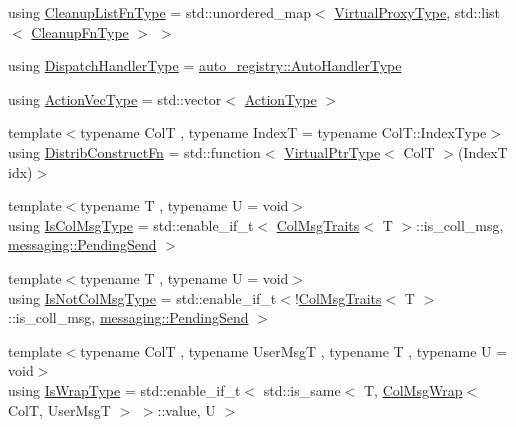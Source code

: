 \begin{DoxyCompactItemize}
using \hyperlink{structvt_1_1vrt_1_1collection_1_1_collection_manager_a735e54bc5a8646536d07750e2549a156}{Cleanup\+List\+Fn\+Type} = std\+::unordered\+\_\+map$<$ \hyperlink{namespacevt_a1b417dd5d684f045bb58a0ede70045ac}{Virtual\+Proxy\+Type}, std\+::list$<$ \hyperlink{structvt_1_1vrt_1_1collection_1_1_collection_manager_a95c122e5b83bc51c306c9367b8e62c07}{Cleanup\+Fn\+Type} $>$ $>$
\item 
using \hyperlink{structvt_1_1vrt_1_1collection_1_1_collection_manager_a0cfe02a0426e95ec9daa2ef7374e07c7}{Dispatch\+Handler\+Type} = \hyperlink{namespacevt_1_1auto__registry_ae295e18699146815bb7d7674594d95d7}{auto\+\_\+registry\+::\+Auto\+Handler\+Type}
\item 
using \hyperlink{structvt_1_1vrt_1_1collection_1_1_collection_manager_a51650235f0e53ae08381942eba822679}{Action\+Vec\+Type} = std\+::vector$<$ \hyperlink{namespacevt_ae0a5a7b18cc99d7b732cb4d44f46b0f3}{Action\+Type} $>$
\item 
{\footnotesize template$<$typename ColT , typename IndexT  = typename Col\+T\+::\+Index\+Type$>$ }\\using \hyperlink{structvt_1_1vrt_1_1collection_1_1_collection_manager_a7503830bc133013d542856fa39834dcc}{Distrib\+Construct\+Fn} = std\+::function$<$ \hyperlink{structvt_1_1vrt_1_1collection_1_1_collection_manager_a1da9015e52d6ecca955f57b59aab0b82}{Virtual\+Ptr\+Type}$<$ ColT $>$(IndexT idx)$>$
\item 
{\footnotesize template$<$typename T , typename U  = void$>$ }\\using \hyperlink{structvt_1_1vrt_1_1collection_1_1_collection_manager_a21c21612c806016788057aeab142af20}{Is\+Col\+Msg\+Type} = std\+::enable\+\_\+if\+\_\+t$<$ \hyperlink{structvt_1_1vrt_1_1collection_1_1_col_msg_traits}{Col\+Msg\+Traits}$<$ T $>$\+::is\+\_\+coll\+\_\+msg, \hyperlink{structvt_1_1messaging_1_1_pending_send}{messaging\+::\+Pending\+Send} $>$
\item 
{\footnotesize template$<$typename T , typename U  = void$>$ }\\using \hyperlink{structvt_1_1vrt_1_1collection_1_1_collection_manager_ae376deeefd4f89a0b1c93849977715d9}{Is\+Not\+Col\+Msg\+Type} = std\+::enable\+\_\+if\+\_\+t$<$!\hyperlink{structvt_1_1vrt_1_1collection_1_1_col_msg_traits}{Col\+Msg\+Traits}$<$ T $>$\+::is\+\_\+coll\+\_\+msg, \hyperlink{structvt_1_1messaging_1_1_pending_send}{messaging\+::\+Pending\+Send} $>$
\item 
{\footnotesize template$<$typename ColT , typename User\+MsgT , typename T , typename U  = void$>$ }\\using \hyperlink{structvt_1_1vrt_1_1collection_1_1_collection_manager_a1f91c97ed52237c3a3576dfbbe87c8f8}{Is\+Wrap\+Type} = std\+::enable\+\_\+if\+\_\+t$<$ std\+::is\+\_\+same$<$ T, \hyperlink{structvt_1_1vrt_1_1collection_1_1_col_msg_wrap}{Col\+Msg\+Wrap}$<$ ColT, User\+MsgT $>$ $>$\+::value, U $>$

\end{DoxyCompactItemize}

